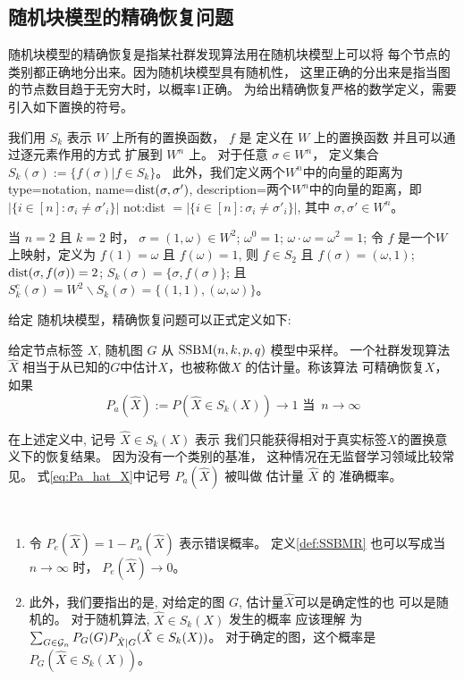 
\subsection{随机块模型的精确恢复问题}\label{sec:exact_recovery}
随机块模型的精确恢复是指某社群发现算法用在随机块模型上可以将
每个节点的类别都正确地分出来。因为随机块模型具有随机性，
这里正确的分出来是指当图的节点数目趋于无穷大时，以概率1正确。
为给出精确恢复严格的数学定义，需要引入如下置换的符号。


我们用 $S_k$ 表示 $W$  上所有的置换函数， 
$f$ 是 定义在 $W$ 上的置换函数
并且可以通过逐元素作用的方式
扩展到 $W^n$ 上。
对于任意 $\sigma \in W^n$，
定义集合 $S_k(\sigma):=\{f(\sigma)| f\in S_k\}$。
此外，我们定义两个$W^n$中的向量的距离为
{
  type=notation,
  name={$\operatorname{dist}(\sigma, \sigma')$},
  description={两个$W^n$中的向量的距离，即$|\{i\in[n]:\sigma_i\neq \sigma'_i\}|$}
}
\gls{not:dist}
$=|\{i\in[n]:\sigma_i\neq \sigma'_i\}|$,
其中 $\sigma,\sigma'\in W^n
$。
\begin{example}
当 $n=2$ 且 $k=2$ 时，
$\sigma=(1, \omega) \in W^2$;
$\omega^0 = 1$; $\omega \cdot \omega = \omega^2 = 1$;
令 $f$ 是一个$W$上映射，定义为
$f(1) = \omega$ 且 $f(\omega)=1$,
则 $f \in S_2$ 且 $f(\sigma) = (\omega, 1)$;
$\operatorname{dist}(\sigma, f(\sigma)) = 2$;
$S_k(\sigma) = \{\sigma, f(\sigma)\}$; 且
$S_k^c(\sigma) = W^2 \backslash S_k(\sigma)
=\{(1, 1), (\omega, \omega)\}$。
\end{example}

给定 随机块模型，精确恢复问题可以正式定义如下:
\begin{definition} \label{def:SSBMR}
给定节点标签 $X$, 随机图 $G$ 从 $\operatorname{SSBM}(n,k,p,q)   $ 模型中采样。
一个社群发现算法$\hat{X}$ 相当于从已知的$G$中估计$X$，也被称做$X$
的估计量。称该算法
可精确恢复$X$，如果
\begin{equation}\label{eq:Pa_hat_X}
P_a(\hat{X}):=P(\hat{X} \in S_k(X)) \to 1 \textrm{ 当 }\, n \to \infty
\end{equation}
\end{definition}

在上述定义中, 记号 $\hat{X} \in S_k(X)$ 表示
我们只能获得相对于真实标签$X$的置换意义下的恢复结果。
因为没有一个类别的基准，
这种情况在无监督学习领域比较常见。
式\eqref{eq:Pa_hat_X}中记号 $P_a(\hat{X})$
被叫做 估计量 $\hat{X}$ 的
准确概率。
\begin{remark}\label{rem:metric_exact_recovery}\,
  \begin{enumerate}
    \item 令 $P_e(\hat{X}) = 1 - P_a(\hat{X})$
    表示错误概率。
    定义\ref{def:SSBMR} 也可以写成当$n\to \infty$
    时，
    $P_e(\hat{X}) \to 0$。
  \item  此外，我们要指出的是, 对给定的图 $G$, 估计量$\hat{X}$可以是确定性的也
  可以是随机的。
  对于随机算法, $\hat{X} \in S_k(X)$ 发生的概率 应该理解
  为 $\sum_{G \in \mathcal{G}_n} P_G(G) P_{\hat{X}|G}(\hat{X} \in S_k(X))$。 
  对于确定的图，这个概率是 $P_G(\hat{X} \in S_k(X))$。  
  \end{enumerate}
\end{remark}

